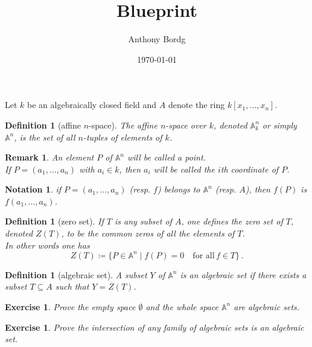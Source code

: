 \documentclass[12pt]{article}
\newtheorem{definition}[proposition]{Definition}
\newtheorem{remark}[proposition]{Remark}
\newtheorem{ex}[proposition]{Exercise}
\newtheorem{notation}{Notation}
\begin{document}
\title{Blueprint}
\author{Anthony Bordg}
\date{\today}
\maketitle
	
Let $k$ be an algebraically closed field and $A$ denote the ring $k \left[ x_1, \dots, x_n \right]$. \\

\begin{definition}[affine $n$-space] 
	The affine $n$-space over $k$, denoted $\mathbb{A}^n_k$ or simply $\mathbb{A}^n$, is the set of all $n$-tuples of elements of $k$.  
\end{definition}

\begin{remark}
	An element $P$ of $\mathbb{A}^n$ will be called a point. \\
	If $P = (a_1, \dots, a_n)$ with $a_i \in k$, then $a_i$ will be called the $i$th coordinate of $P$.
\end{remark}

\begin{notation}
	if $P = (a_1, \dots, a_n)$ (\textit{resp.} $f$) belongs to $\mathbb{A}^n$ (\textit{resp.} $A$), then $f(P)$ is $f(a_1, \dots, a_n)$.
\end{notation}		

\begin{definition}[zero set]
	If $T$ is any subset of $A$, one defines the zero set of $T$, denoted $Z(T)$, to be the common zeros of all the elements of $T$. \\
	In other words one has
	\[
	Z(T) \coloneqq \lbrace P \in \mathbb{A}^n \mid f(P) = 0 \quad \text{for all}\, f \in T \rbrace \, . 
	\]
\end{definition}

\begin{definition}[algebraic set]
	A subset $Y$ of $\mathbb{A}^n$ is an algebraic set if there exists a subset $T \subseteq A$ such that $Y = Z(T)$. 
\end{definition}

\begin{ex}
	Prove the empty space $\emptyset$ and the whole space $\mathbb{A}^n$ are algebraic sets.
\end{ex}

\begin{ex}
	Prove the intersection of any family of algebraic sets is an algebraic set.
\end{ex}
\end{document}
